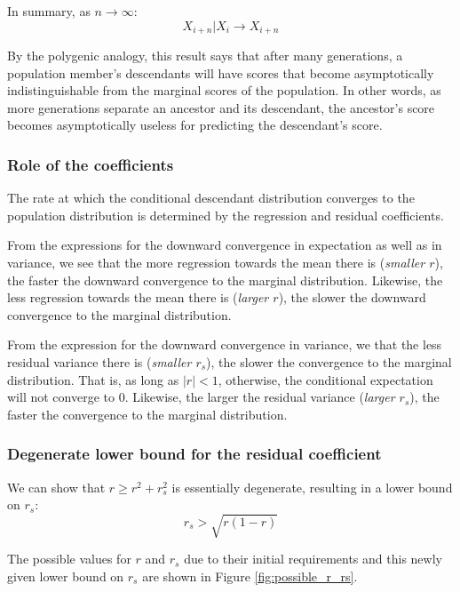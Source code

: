 \documentclass[a4paper,11pt]{article} %
\begin{document}
In summary, as $n \rightarrow \infty$:
$$X_{i+n}|X_i \rightarrow X_{i+n}$$

By the polygenic analogy, this result says that after many generations, a population member's descendants will have scores that become asymptotically indistinguishable from the marginal scores of the population. In other words, as more generations separate an ancestor and its descendant, the ancestor's score becomes asymptotically useless for predicting the descendant's score.


\subsubsection*{Role of the coefficients}
The rate at which the conditional descendant distribution converges to the population distribution is determined by the regression and residual coefficients. 

From the expressions for the downward convergence in expectation as well as in variance, we see that the more regression towards the mean there is (\emph{smaller $r$}), the faster the downward convergence to the marginal distribution. Likewise, the less regression towards the mean there is (\emph{larger $r$}), the slower the downward convergence to the marginal distribution. 

From the expression for the downward convergence in variance, we that the less residual variance there is (\emph{smaller $r_s$}), the slower the convergence to the marginal distribution. That is, as long as $|r| < 1$, otherwise, the conditional expectation will not converge to $0$. Likewise, the larger the residual variance (\emph{larger $r_s$}), the faster the convergence to the marginal distribution. 


\subsubsection*{Degenerate lower bound for the residual coefficient}
We can show that $r \geq r^2 + r_s^2$ is essentially degenerate, resulting in a lower bound on $r_s$:
$$r_s > \sqrt{r(1-r)}$$

The possible values for $r$ and $r_s$ due to their initial requirements and this newly given lower bound on $r_s$ are shown in Figure \ref{fig:possible_r_rs}. 
\end{document}
